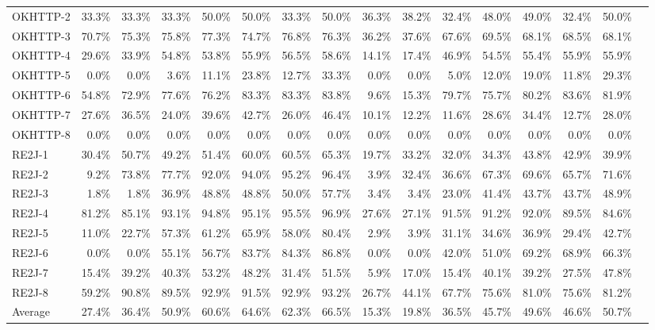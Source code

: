 \begin{tabular}{ l rrrrrrr rrrrrrrr}
OKHTTP-2 &  33.3\% &  33.3\% &  33.3\% &  50.0\% &  50.0\% &  33.3\% &  50.0\% &  36.3\% &  38.2\% &  32.4\% &  48.0\% &  49.0\% &  32.4\% &  50.0\%\\ 
OKHTTP-3 &  70.7\% &  75.3\% &  75.8\% &  77.3\% &  74.7\% &  76.8\% &  76.3\% &  36.2\% &  37.6\% &  67.6\% &  69.5\% &  68.1\% &  68.5\% &  68.1\%\\ 
OKHTTP-4 &  29.6\% &  33.9\% &  54.8\% &  53.8\% &  55.9\% &  56.5\% &  58.6\% &  14.1\% &  17.4\% &  46.9\% &  54.5\% &  55.4\% &  55.9\% &  55.9\%\\ 
OKHTTP-5 &  0.0\% &  0.0\% &  3.6\% &  11.1\% &  23.8\% &  12.7\% &  33.3\% &  0.0\% &  0.0\% &  5.0\% &  12.0\% &  19.0\% &  11.8\% &  29.3\%\\ 
OKHTTP-6 &  54.8\% &  72.9\% &  77.6\% &  76.2\% &  83.3\% &  83.3\% &  83.8\% &  9.6\% &  15.3\% &  79.7\% &  75.7\% &  80.2\% &  83.6\% &  81.9\%\\ 
OKHTTP-7 &  27.6\% &  36.5\% &  24.0\% &  39.6\% &  42.7\% &  26.0\% &  46.4\% &  10.1\% &  12.2\% &  11.6\% &  28.6\% &  34.4\% &  12.7\% &  28.0\%\\ 
OKHTTP-8 &  0.0\% &  0.0\% &  0.0\% &  0.0\% &  0.0\% &  0.0\% &  0.0\% &  0.0\% &  0.0\% &  0.0\% &  0.0\% &  0.0\% &  0.0\% &  0.0\%\\ 
RE2J-1 &  30.4\% &  50.7\% &  49.2\% &  51.4\% &  60.0\% &  60.5\% &  65.3\% &  19.7\% &  33.2\% &  32.0\% &  34.3\% &  43.8\% &  42.9\% &  39.9\%\\ 
RE2J-2 &  9.2\% &  73.8\% &  77.7\% &  92.0\% &  94.0\% &  95.2\% &  96.4\% &  3.9\% &  32.4\% &  36.6\% &  67.3\% &  69.6\% &  65.7\% &  71.6\%\\ 
RE2J-3 &  1.8\% &  1.8\% &  36.9\% &  48.8\% &  48.8\% &  50.0\% &  57.7\% &  3.4\% &  3.4\% &  23.0\% &  41.4\% &  43.7\% &  43.7\% &  48.9\%\\ 
RE2J-4 &  81.2\% &  85.1\% &  93.1\% &  94.8\% &  95.1\% &  95.5\% &  96.9\% &  27.6\% &  27.1\% &  91.5\% &  91.2\% &  92.0\% &  89.5\% &  84.6\%\\ 
RE2J-5 &  11.0\% &  22.7\% &  57.3\% &  61.2\% &  65.9\% &  58.0\% &  80.4\% &  2.9\% &  3.9\% &  31.1\% &  34.6\% &  36.9\% &  29.4\% &  42.7\%\\ 
RE2J-6 &  0.0\% &  0.0\% &  55.1\% &  56.7\% &  83.7\% &  84.3\% &  86.8\% &  0.0\% &  0.0\% &  42.0\% &  51.0\% &  69.2\% &  68.9\% &  66.3\%\\ 
RE2J-7 &  15.4\% &  39.2\% &  40.3\% &  53.2\% &  48.2\% &  31.4\% &  51.5\% &  5.9\% &  17.0\% &  15.4\% &  40.1\% &  39.2\% &  27.5\% &  47.8\%\\ 
RE2J-8 &  59.2\% &  90.8\% &  89.5\% &  92.9\% &  91.5\% &  92.9\% &  93.2\% &  26.7\% &  44.1\% &  67.7\% &  75.6\% &  81.0\% &  75.6\% &  81.2\%\\ 
\midrule 
Average  &  27.4\% &  36.4\% &  50.9\% &  60.6\% &  64.6\% &  62.3\% &  66.5\% &  15.3\% &  19.8\% &  36.5\% &  45.7\% &  49.6\% &  46.6\% &  50.7\%\\ 
\bottomrule 
\end{tabular} 
